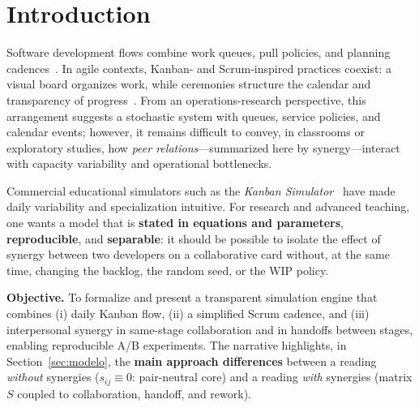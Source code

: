 \section{Introduction}

Software development flows combine work queues, pull policies, and planning cadences~\cite{poppendieck2003lean,anderson2010kanban}. In agile contexts, Kanban- and Scrum-inspired practices coexist: a visual board organizes work, while ceremonies structure the calendar and transparency of progress~\cite{schwaber2002agile}. From an operations-research perspective, this arrangement suggests a stochastic system with queues, service policies, and calendar events; however, it remains difficult to convey, in classrooms or exploratory studies, how \emph{peer relations}---summarized here by synergy---interact with capacity variability and operational bottlenecks.

Commercial educational simulators such as the \emph{Kanban Simulator}~\cite{kanbanSimulator} have made daily variability and specialization intuitive. For research and advanced teaching, one wants a model that is \textbf{stated in equations and parameters}, \textbf{reproducible}, and \textbf{separable}: it should be possible to isolate the effect of synergy between two developers on a collaborative card without, at the same time, changing the backlog, the random seed, or the WIP policy.

\textbf{Objective.} To formalize and present a transparent simulation engine that combines (i) daily Kanban flow, (ii) a simplified Scrum cadence, and (iii) interpersonal synergy in same-stage collaboration and in handoffs between stages, enabling reproducible A/B experiments. The narrative highlights, in Section~\ref{sec:modelo}, the \textbf{main approach differences} between a reading \emph{without} synergies ($s_{ij}\equiv 0$: pair-neutral core) and a reading \emph{with} synergies (matrix $S$ coupled to collaboration, handoff, and rework).


